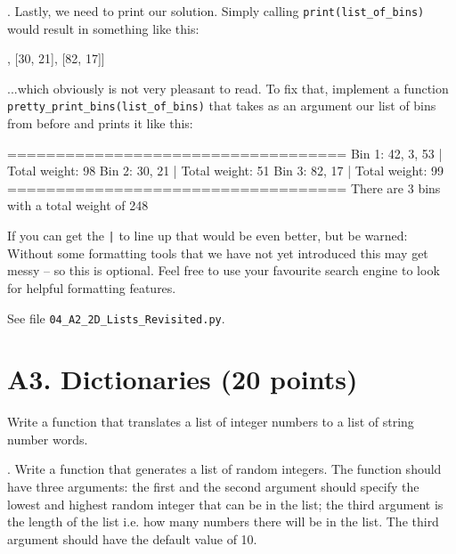 \vspace{1em}

. Lastly, we need to print our solution. Simply calling \texttt{print(list\_of\_bins)} would result in something like this:

\begin{outputcode}
[[42, 3, 53], [30, 21], [82, 17]]
\end{outputcode}

\noindent ...which obviously is not very pleasant to read. To fix that, implement a function \texttt{pretty\_print\_bins(list\_of\_bins)} that takes as an argument our list of bins from before and prints it like this:

\begin{outputcode}
===================================
Bin 1: 42, 3, 53 | Total weight: 98
Bin 2: 30, 21 | Total weight: 51
Bin 3: 82, 17 | Total weight: 99
===================================
There are 3 bins with a total weight of 248
\end{outputcode}

\noindent If you can get the \texttt{|} to line up that would be even better, but be warned: Without some formatting tools that we have not yet introduced this may get messy -- so this is optional. Feel free to use your favourite search engine to look for helpful formatting features.

\vspace{1em}

\begin{solution}
See file \texttt{04\_A2\_2D\_Lists\_Revisited.py}.
\end{solution}

\section*{A3. Dictionaries (20 points)}

Write a function that translates a list of integer numbers to a list of string number words.
\vspace{1em}

. Write a function that generates a list of random integers. The function should have three arguments:
the first and the second argument should specify the lowest and highest random integer that can be in the list;
the third argument is the length of the list i.e. how many numbers there will be in the list. The third argument should have the default value of 10.
\vspace{1em}

